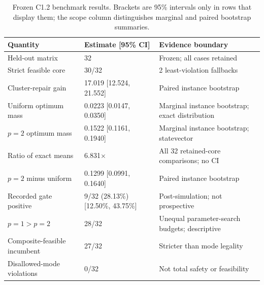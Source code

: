 \begin{table}[t]
\caption{Frozen C1.2 benchmark results. Brackets are 95\% intervals only in rows that display them; the scope column distinguishes marginal and paired bootstrap summaries.}\label{tab:results}
\small\renewcommand{\arraystretch}{1.08}\setlength{\tabcolsep}{3pt}
\begin{tabularx}{\columnwidth}{@{}p{}p{}Y@{}}
\toprule
\textbf{Quantity} & \textbf{Estimate [95\% CI]} & \textbf{Evidence boundary} \\
\midrule
Held-out matrix & 32 & Frozen; all cases retained \\
Strict feasible core & 30/32 & 2 least-violation fallbacks \\
Cluster-repair gain & 17.019 [12.524, 21.552] & Paired instance bootstrap \\
Uniform optimum mass & 0.0223 [0.0147, 0.0350] & Marginal instance bootstrap; exact distribution \\
$p=2$ optimum mass & 0.1522 [0.1161, 0.1940] & Marginal instance bootstrap; statevector \\
Ratio of exact means & 6.831$\times$ & All 32 retained-core comparisons; no CI \\
$p=2$ minus uniform & 0.1299 [0.0991, 0.1640] & Paired instance bootstrap \\
Recorded gate positive & 9/32 (28.13\%) [12.50\%, 43.75\%] & Post-simulation; not prospective \\
$p=1>p=2$ & 28/32 & Unequal parameter-search budgets; descriptive \\
Composite-feasible incumbent & 27/32 & Stricter than mode legality \\
Disallowed-mode violations & 0/32 & Not total safety or feasibility \\
\bottomrule
\end{tabularx}
\end{table}

